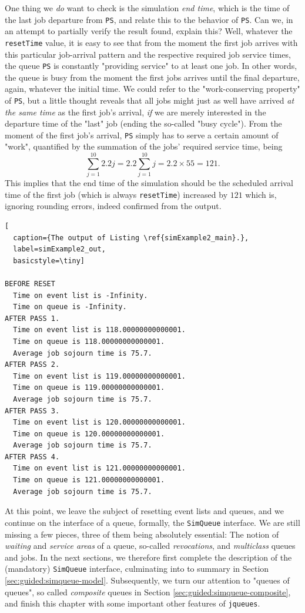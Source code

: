 \documentclass[12pt]{book}
\begin{document}
One thing we {\em do\/} want to check is the simulation {\em end time\/},
  which is the time of the last job departure from \lstinline|PS|,
  and relate this to the behavior of \lstinline|PS|.
Can we, in an attempt to partially verify the result found, explain this?
Well, whatever the \lstinline|resetTime| value,
  it is easy to see that from the moment the first job
  arrives with this particular job-arrival pattern
  and the respective required job service times,
  the queue \lstinline|PS|
  is constantly "providing service" to at least one job.
In other words, the queue is busy from the moment
  the first jobs arrives until the final departure,
  again, whatever the initial time.
We could refer to the "work-conserving property" of
  \lstinline|PS|, but a little thought reveals
  that all jobs might just as well have arrived
  {\em at the same time\/} as the first job's arrival,
  {\em if\/} we are merely interested in the departure time of
  the "last" job (ending the so-called "busy cycle").
From the moment of the first job's arrival,
  \lstinline|PS| simply has to serve
  a certain amount of "work",
  quantified by the summation of the jobs'
  required service time,
  being
\[
  \sum_{j=1}^{10} 2.2j = 2.2 \sum_{j=1}^{10} j = 2.2 \times 55 = 121.
\]
This implies that the end time of the simulation should
  be the scheduled arrival time of the first job
  (which is always \lstinline|resetTime|)
  increased by $121$
  which is,
  ignoring rounding errors,
  indeed confirmed from the output.

\begin{lstlisting}[
  caption={The output of Listing \ref{simExample2_main}.},
  label=simExample2_out,
  basicstyle=\tiny]

BEFORE RESET
  Time on event list is -Infinity.
  Time on queue is -Infinity.
AFTER PASS 1.
  Time on event list is 118.00000000000001.
  Time on queue is 118.00000000000001.
  Average job sojourn time is 75.7.
AFTER PASS 2.
  Time on event list is 119.00000000000001.
  Time on queue is 119.00000000000001.
  Average job sojourn time is 75.7.
AFTER PASS 3.
  Time on event list is 120.00000000000001.
  Time on queue is 120.00000000000001.
  Average job sojourn time is 75.7.
AFTER PASS 4.
  Time on event list is 121.00000000000001.
  Time on queue is 121.00000000000001.
  Average job sojourn time is 75.7.

\end{lstlisting}

At this point,
  we leave the subject of resetting event lists and queues,
  and we continue on the interface of a queue,
  formally, the \lstinline|SimQueue| interface.
We are still missing a few pieces,
  three of them being absolutely essential:
  The notion of {\em waiting\/} and {\em service areas\/}
  of a queue, so-called {\em revocations},
  and {\em multiclass\/} queues and jobs.
In the next sections,
  we therefore first complete the description of the (mandatory)
  \lstinline|SimQueue| interface,
  culminating into to summary
  in Section \ref{sec:guided:simqueue-model}.
Subsequently,
  we turn our attention to "queues of queues",
  so called {\em composite\/} queues in Section \ref{sec:guided:simqueue-composite},
  and finish this chapter with
  some important other features of \lstinline|jqueues|.
\end{document}
